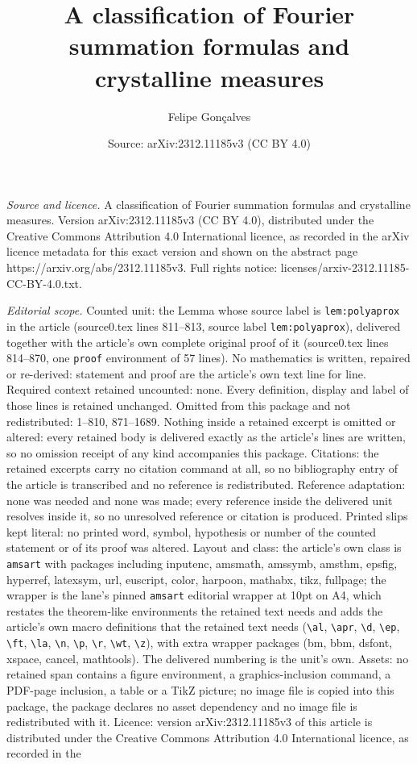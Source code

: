 \documentclass[10pt,a4paper]{amsart}
\title[A classification of Fourier summation formulas and crystalli]{A classification of Fourier summation formulas and crystalline measures}
\author{Felipe Gon\c{c}alves}
\date{Source: arXiv:2312.11185v3 (CC BY 4.0)}
\begin{document}
\maketitle

\noindent\emph{Source and licence.} A classification of Fourier summation formulas and crystalline measures. Version arXiv:2312.11185v3 (CC BY 4.0), distributed under the Creative Commons Attribution 4.0 International licence, as recorded in the arXiv licence metadata for this exact version and shown on the abstract page https://arxiv.org/abs/2312.11185v3. Full rights notice: licenses/arxiv-2312.11185-CC-BY-4.0.txt.\par\smallskip

\noindent\textit{Editorial scope.} Counted unit: the Lemma whose source label is \texttt{lem:polyaprox} in the article (source0.tex lines 811--813, source label \texttt{lem:polyaprox}), delivered together with the article's own complete original proof of it (source0.tex lines 814--870, one \texttt{proof} environment of 57 lines). No mathematics is written, repaired or re-derived: statement and proof are the article's own text line for line. Required context retained uncounted: none. Every definition, display and label of those lines is retained unchanged. Omitted from this package and not redistributed: 1--810, 871--1689. Nothing inside a retained excerpt is omitted or altered: every retained body is delivered exactly as the article's lines are written, so no omission receipt of any kind accompanies this package. Citations: the retained excerpts carry no citation command at all, so no bibliography entry of the article is transcribed and no reference is redistributed. Reference adaptation: none was needed and none was made; every reference inside the delivered unit resolves inside it, so no unresolved reference or citation is produced. Printed slips kept literal: no printed word, symbol, hypothesis or number of the counted statement or of its proof was altered. Layout and class: the article's own class is \texttt{amsart} with packages including inputenc, amsmath, amssymb, amsthm, epsfig, hyperref, latexsym, url, euscript, color, harpoon, mathabx, tikz, fullpage; the wrapper is the lane's pinned \texttt{amsart} editorial wrapper at 10pt on A4, which restates the theorem-like environments the retained text needs and adds the article's own macro definitions that the retained text needs (\texttt{\textbackslash al}, \texttt{\textbackslash apr}, \texttt{\textbackslash d}, \texttt{\textbackslash ep}, \texttt{\textbackslash ft}, \texttt{\textbackslash la}, \texttt{\textbackslash n}, \texttt{\textbackslash p}, \texttt{\textbackslash r}, \texttt{\textbackslash wt}, \texttt{\textbackslash z}), with extra wrapper packages (bm, bbm, dsfont, xspace, cancel, mathtools). The delivered numbering is the unit's own. Assets: no retained span contains a figure environment, a graphics-inclusion command, a PDF-page inclusion, a table or a TikZ picture; no image file is copied into this package, the package declares no asset dependency and no image file is redistributed with it. Licence: version arXiv:2312.11185v3 of this article is distributed under the Creative Commons Attribution 4.0 International licence, as recorded in the 
\end{document}
